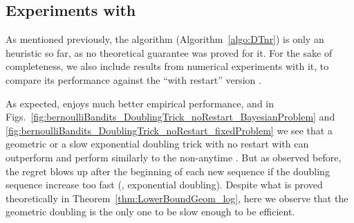 \documentclass[12pt]{colt2018} %
\begin{document}


\subsection{Experiments with \DTnr}\label{sub:experimentsDTnr}

As mentioned previously, the \DTnr{} algorithm (Algorithm~\ref{algo:DTnr})
is only an heuristic so far, as no theoretical guarantee was proved for it.
%
For the sake of completeness, we also include results from numerical experiments with it, to compare its performance against the ``with restart'' version \DTr.

As expected, \DTnr{} enjoys much better empirical performance,
and in Figs.~\ref{fig:bernoulliBandits_DoublingTrick_noRestart_BayesianProblem} and \ref{fig:bernoulliBandits_DoublingTrick_noRestart_fixedProblem} we see that a geometric or a slow exponential doubling trick with no restart with \KLUCBpp{} can outperform \KLUCB{} and perform similarly to the non-anytime \KLUCBpp.
%
But as observed before, the regret blows up after the beginning of each new sequence if the doubling sequence increase too fast (\eg, exponential doubling).
Despite what is proved theoretically in Theorem~\ref{thm:LowerBoundGeom_log}, here we observe that the geometric doubling is the only one to be slow enough to be efficient.
\end{document}
